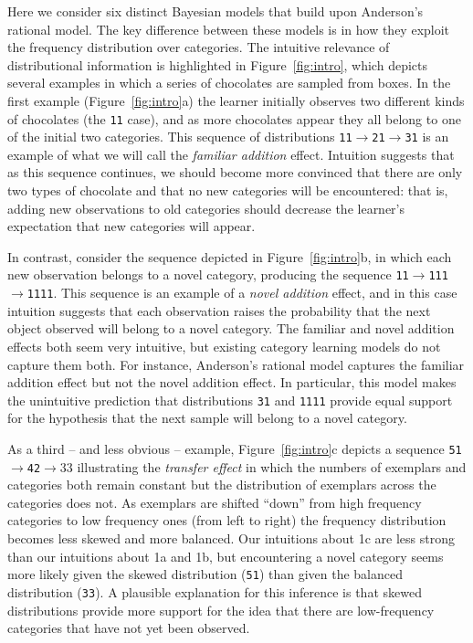\documentclass[doc]{apa6}
\newcommand{\dist}[1]{\texttt{#1}}
\newcommand{\goesto}{$\rightarrow$}
\begin{document}
Here we consider six distinct Bayesian models that build upon Anderson's rational model. The key difference between these models is in how they exploit the frequency distribution over categories.  The intuitive relevance of distributional information is highlighted in Figure~\ref{fig:intro}, which depicts several examples in which a series of chocolates are sampled from boxes. In the first example (Figure~\ref{fig:intro}a) the learner initially observes two different kinds of chocolates (the \dist{11} case), and as more chocolates appear they all belong to one of the initial two categories. This sequence of distributions \dist{11}\goesto\dist{21}\goesto\dist{31} is an example of what we will call the {\it familiar addition} effect. Intuition suggests that as this sequence continues, we should become more convinced that there are only two types of chocolate and that no new categories will be encountered: that is, adding new observations to old categories should decrease the learner's expectation that new categories will appear.

In contrast, consider the sequence depicted in Figure~\ref{fig:intro}b, in which each new observation belongs to a novel category, producing the sequence \dist{11}\goesto\dist{111}\goesto\dist{1111}. This sequence is an example of a {\it novel addition} effect, and in this case intuition suggests that each observation raises the probability that the next object observed will belong to a novel category. The familiar and novel addition effects both seem very intuitive, but existing category learning models do not capture them both. For instance,  Anderson's rational model captures the familiar addition effect but not the novel addition effect. In particular, this model makes the unintuitive prediction that distributions \dist{31} and \dist{1111} provide equal support for the hypothesis that the next sample will belong to a novel category.

As a third -- and less obvious -- example, Figure~\ref{fig:intro}c depicts a sequence \dist{51}\goesto\dist{42}\goesto{33} illustrating the {\it transfer effect} in which the numbers of exemplars and categories both remain constant but the distribution of exemplars across the categories does not. As exemplars are shifted ``down'' from high frequency categories to low frequency ones (from left to right) the frequency distribution becomes less skewed and more balanced. Our intuitions about 1c are less strong than our intuitions about 1a and 1b, but encountering a novel category seems more likely given the skewed distribution (\dist{51}) than given the balanced distribution (\dist{33}). A plausible explanation for this inference is that skewed distributions provide more support for the idea that there are low-frequency categories that have not yet been observed.
\end{document}
